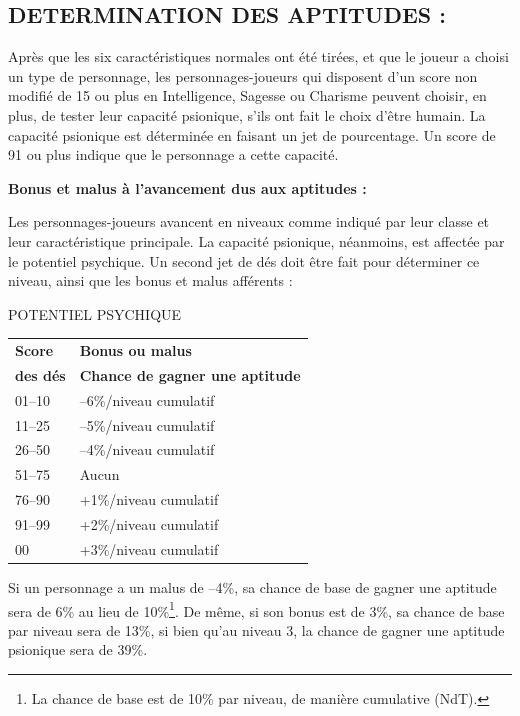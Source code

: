 \documentclass[11pt]{article}
\begin{document}
{\subsection*{{\normalsize DETERMINATION DES APTITUDES :}}

\medskip

Après que les six caractéristiques normales ont été tirées, et que le joueur a choisi un type de personnage, les personnages-joueurs qui disposent d'un score non modifié de 15 ou plus en Intelligence, Sagesse ou Charisme peuvent choisir, en plus, de tester leur capacité psionique, s'ils ont fait le choix d'être humain. La capacité psionique est déterminée en faisant un jet de pourcentage. Un score de 91 ou plus indique que le personnage a cette capacité.

\bigskip

\textbf{Bonus et malus à l'avancement dus aux aptitudes :}

\bigskip

Les personnages-joueurs avancent en niveaux comme indiqué par leur classe et leur caractéristique principale. La capacité psionique, néanmoins, est affectée par le potentiel psychique. Un second jet de dés doit être fait pour déterminer ce niveau, ainsi que les bonus et malus afférents :

\bigskip

{\parindent3cm POTENTIEL PSYCHIQUE

\bigskip

\begin{tabular}{p{3cm}l}
\textbf{Score} & \textbf{Bonus ou malus} \\
\textbf{des dés} & \textbf{Chance de gagner une aptitude} \\
01--10 & --6\%/niveau cumulatif \\
11--25 & --5\%/niveau cumulatif \\
26--50 & --4\%/niveau cumulatif \\
51--75 & Aucun \\
76--90 & +1\%/niveau cumulatif \\
91--99 & +2\%/niveau cumulatif \\
\hspace{0.4cm}00 & +3\%/niveau cumulatif \\
\end{tabular}}

\bigskip

Si un personnage a un malus de --4\%, sa chance de base de gagner une aptitude sera de 6\% au lieu de 10\%\footnote{La chance de base est de 10\% par niveau, de manière cumulative (NdT).}. De même, si son bonus est de 3\%, sa chance de base par niveau sera de 13\%, si bien qu'au niveau 3, la chance de gagner une aptitude psionique sera de 39\%.

}
\end{document}
